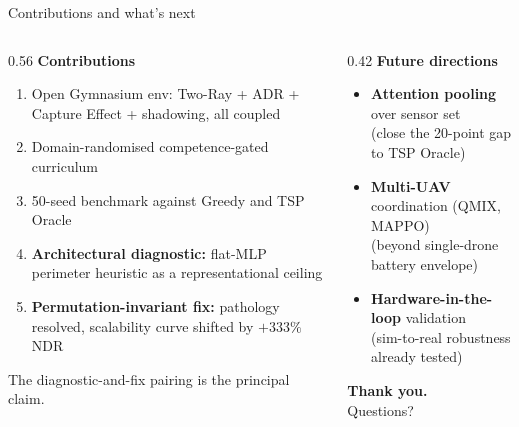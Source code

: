\documentclass[aspectratio=169,11pt]{beamer}
\newcommand{\emp}[1]{{\color{manpurple}\textbf{#1}}}
\newcommand{\qt}[1]{{\color{muted}#1}}
\begin{document}
\begin{frame}{Contributions and what's next}
  \begin{columns}[T]
    \begin{column}{0.56\textwidth}
      \small
      \textbf{Contributions}
      \begin{enumerate}
        \item Open Gymnasium env: Two-Ray + ADR + Capture
          Effect + shadowing, all coupled
        \item Domain-randomised competence-gated curriculum
        \item 50-seed benchmark against Greedy and TSP Oracle
        \item \emp{Architectural diagnostic:} flat-MLP perimeter
          heuristic as a representational ceiling
        \item \emp{Permutation-invariant fix:} pathology resolved,
          scalability curve shifted by $+333\%$ NDR
      \end{enumerate}
      \vspace{0.4em}
      \centering
      \qt{The diagnostic-and-fix pairing is the principal claim.}
    \end{column}
    \begin{column}{0.42\textwidth}
      \small
      \textbf{Future directions}
      \begin{itemize}
        \item \emp{Attention pooling} over sensor set\\
          \qt{(close the 20-point gap to TSP Oracle)}
        \item \emp{Multi-UAV} coordination (QMIX, MAPPO)\\
          \qt{(beyond single-drone battery envelope)}
        \item \emp{Hardware-in-the-loop} validation\\
          \qt{(sim-to-real robustness already tested)}
      \end{itemize}
      \vfill
      \centering
      {\LARGE\emp{Thank you.}}\\[0.4em]
      \small\qt{Questions?}
    \end{column}
  \end{columns}
\end{frame}
\end{document}

